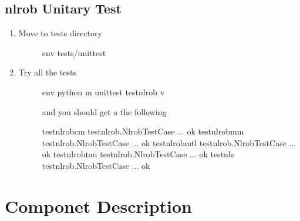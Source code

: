 \documentclass[letterpaper,10pt,english]{sphinxmanual}
\begin{document}
\section{nlrob Unitary Test}
\label{\detokenize{tests:nlrob-unitary-test}}\begin{enumerate}
\item {} \begin{description}
\item[{Move to tests directory}] \leavevmode
{}%
\begin{sphinxVerbatim}[commandchars=\\\{\}]
env \PYGZdl{}  tests/unittest
\end{sphinxVerbatim}

\end{description}

\item {} \begin{description}
\item[{Try all the tests}] \leavevmode
{}%
\begin{sphinxVerbatim}[commandchars=\\\{\}]
env \PYGZdl{} python \PYGZhy{}m unittest test\PYGZus{}nlrob \PYGZhy{}v
\end{sphinxVerbatim}

and you should get a the following

%
\begin{sphinxVerbatim}[commandchars=\\\{\}]
test\PYGZus{}nlrob\PYGZus{}cm test\PYGZus{}nlrob.NlrobTestCase ... ok
test\PYGZus{}nlrob\PYGZus{}mm test\PYGZus{}nlrob.NlrobTestCase ... ok
test\PYGZus{}nlrob\PYGZus{}mtl test\PYGZus{}nlrob.NlrobTestCase ... ok
test\PYGZus{}nlrob\PYGZus{}tau test\PYGZus{}nlrob.NlrobTestCase ... ok
test\PYGZus{}nls test\PYGZus{}nlrob.NlrobTestCase ... ok
\end{sphinxVerbatim}

\end{description}

\end{enumerate}


\chapter{Componet Description}
\label{\detokenize{component_description:componet-description}}\label{\detokenize{component_description:id1}}\label{\detokenize{component_description::doc}}
\end{document}
